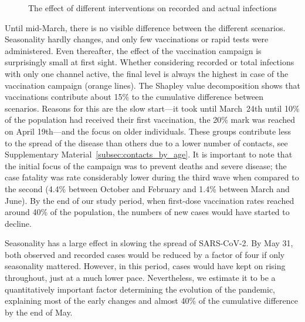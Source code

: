 \begin{figure}[!tp]
    \caption{The effect of different interventions on recorded and actual infections}
    \label{fig:2021_scenarios_broad}

\end{figure}

Until mid-March, there is no visible difference between the different scenarios.
Seasonality hardly changes, and only few vaccinations or rapid tests were administered.
Even thereafter, the effect of the vaccination campaign is surprisingly small at first
sight. Whether considering recorded or total infections with only one channel active,
the final level is always the highest in case of the vaccination campaign (orange
lines). The Shapley value decomposition shows that vaccinations contribute about 15\% to
the cumulative difference between scenarios. Reasons for this are the slow start---it
took until March~24th until 10\% of the population had received their first vaccination,
the 20\% mark was reached on April 19th---and the focus on older individuals. These
groups contribute less to the spread of the disease than others due to a lower number of
contacts, see Supplementary Material~\ref{subsec:contacts_by_age}. It is important to
note that the initial focus of the campaign was to prevent deaths and severe disease;
the case fatality was rate considerably lower during the third wave when compared to the
second (4.4\% between October and February and 1.4\% between March and June). By the end
of our study period, when first-dose vaccination rates reached around 40\% of the
population, the numbers of new cases would have started to decline.

Seasonality has a large effect in slowing the spread of SARS-CoV-2. By May 31, both
observed and recorded cases would be reduced by a factor of four if only seasonality
mattered. However, in this period, cases would have kept on rising throughout, just at a
much lower pace. Nevertheless, we estimate it to be a quantitatively important factor
determining the evolution of the pandemic, explaining most of the early changes and
almost 40\% of the cumulative difference by the end of May.

